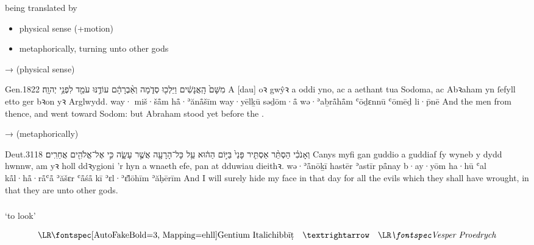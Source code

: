 \begin{frame}{ being translated by }
	\begin{itemize}
		\item physical sense (+motion)\hfill{}
		\item metaphorically, turning unto other gods\hfill{}
	\end{itemize}
\end{frame}


\begin{frame}{\exwref {} →  (physical sense)}
	\exstep
	\begin{example}{Gen.}{18}{22}{}{}
		\quoling
		{ מִשָּׁם֙ הָֽאֲנָשִׁ֔ים וַיֵּלְכ֖וּ סְדֹ֑מָה וְאַ֨בְרָהָ֔ם עוֹדֶ֥נּוּ עֹמֵ֖ד לִפְנֵ֥י יְהוָֽה׃}
		{A [dau] oꝛ gwŷꝛ a  oddi yno, ac a aethant tua Sodoma, ac Abꝛaham yn ſefyll  etto ger bꝛon yꝛ Arglwydd.}
		{way· miš·šå̄m hå̄·ʾănå̄šīm way·yēlḵū səḏōm·å̄ wə·ʾaḇrå̄hå̄m ʿōḏɛnnū ʿōmēḏ li·p̄nē {\YHWH}}
		{And the men  from thence, and went toward Sodom: but Abraham stood yet before the {\LORD}.}
	\end{example}
\end{frame}


\begin{frame}{\exwref {} →  (metaphorically)}
	\exstep
	\begin{example}{Deut.}{31}{18}{}{}
		\quoling
		{וְאָנֹכִ֗י הַסְתֵּ֨ר אַסְתִּ֤יר פָּנַי֙ בַּיּ֣וֹם הַה֔וּא עַ֥ל כָּל־הָרָעָ֖ה אֲשֶׁ֣ר עָשָׂ֑ה כִּ֣י  אֶל־אֱלֹהִ֖ים אֲחֵרִֽים׃}
		{Canys myfi gan guddio a guddiaf fy wyneb y dydd hwnnw, am yꝛ holl ddꝛygioni ’r hyn a wnaeth efe, pan  at dduwiau dieithꝛ.}
		{wə·ʾå̄nōḵī hastēr ʾastīr på̄nay b·ay·yōm ha·hū ʿal kå̄l·hå̄·rå̄ʿå̄ ʾăšɛr ʿå̄śå̄ kī  ʾɛl·ʾɛ̆lōhīm ʾăḥērīm}
		{And I will surely hide my face in that day for all the evils which they shall have wrought, in that they are  unto other gods.}
	\end{example}
\end{frame}



\subsubsection{}

\begin{frame}{ ‘to look’}
	\begin{center}
		$$
		\mtext{\bh{hibbīṭ}} \transto
		\mtext{\C{edrych}}
		$$
	\end{center}
\end{frame}


